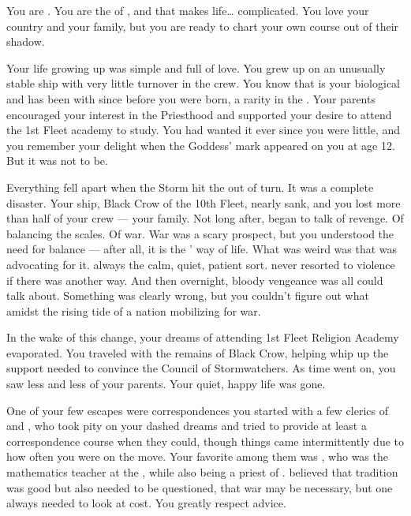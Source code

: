 \documentclass[char]{GL2020}
\begin{document}
\name{\cWarlordDaughter{}}

You are \cWarlordDaughter{\intro}. You are the \cWarlordDaughter{\offspring} of \cLoud{\intro}, and that makes life\ldots{} complicated. You love your country and your family, but you are ready to chart your own course out of their shadow.

Your life growing up was simple and full of love. You grew up on an unusually stable ship with very little turnover in the crew. You know that \cLoud{} is your biological \cLoud{\parent} and has been with \cQuiet{\full} since before you were born, a rarity in the \pShip{}. Your parents encouraged your interest in the Priesthood and supported your desire to attend the 1st Fleet academy to study. You had wanted it ever since you were little, and you remember your delight when the Goddess’ mark appeared on you at age 12. But it was not to be.

Everything fell apart when the Storm hit the \pShip{} out of turn. It was a complete disaster. Your ship, Black Crow of the 10th Fleet, nearly sank, and you lost more than half of your crew — your family. Not long after, \cLoud{} began to talk of revenge. Of balancing the scales. Of war. War was a scary prospect, but you understood the need for balance — after all, it is the \pShippies{}’ way of life. What was weird was that \cLoud{} was advocating for it. \cLoud{\Theywere} always the calm, quiet, patient sort. \cLoud{\They} never resorted to violence if there was another way. And then overnight, bloody vengeance was all \cLoud{\they} could talk about. Something was clearly wrong, but you couldn't figure out what amidst the rising tide of a nation mobilizing for war. 

In the wake of this change, your dreams of attending 1st Fleet Religion Academy evaporated. You traveled with the remains of Black Crow, helping \cLoud{} whip up the support \cLoud{\they} needed to convince the Council of Stormwatchers. As time went on, you saw less and less of your parents. Your quiet, happy life was gone.  

One of your few escapes were correspondences you started with a few clerics of \cEbb{} and \cFlow{}, who took pity on your dashed dreams and tried to provide at least a correspondence course when they could, though things came intermittently due to how often you were on the move. Your favorite among them was \cFlowPriest{\full}, who was the mathematics teacher at the \pSchool{}, while also being a priest of \cFlow{}. \cFlowPriest{\They} believed that tradition was good but also needed to be questioned, that war may be necessary, but one always needed to look at cost. You greatly respect \cFlowPriest{\their} advice. 
\end{document}
